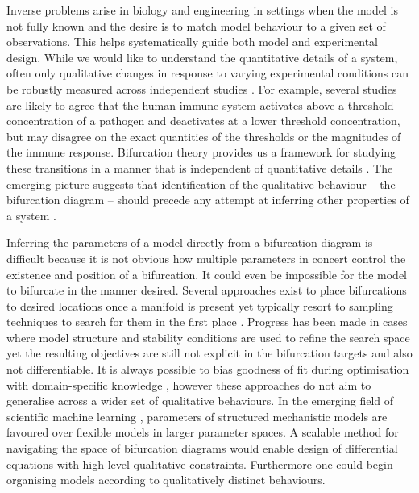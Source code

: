\documentclass{article}
\begin{document}
Inverse problems \cite{Abdulla2009InverseBiology} arise in biology and engineering in settings when the model is not fully known and the desire is to match model behaviour to a given set of observations. This helps systematically guide both model and experimental design. While we would like to understand the quantitative details of a system, often only qualitative changes in response to varying experimental conditions can be robustly measured across independent studies \cite{Tyson2001NetworkPhysiology,Grant2020InterpretationCircuit}. For example, several studies are likely to agree that the human immune system activates above a threshold concentration of a pathogen and deactivates at a lower threshold concentration, but may disagree on the exact quantities of the thresholds or the magnitudes of the immune response. Bifurcation theory provides us a framework for studying these transitions in a manner that is independent of quantitative details \cite{Kuznetsov2004TopologicalSystems}. The emerging picture suggests that identification of the qualitative behaviour -- the bifurcation diagram -- should precede any attempt at inferring other properties of a system \cite{Stumpf2019ParameterBifurcations}.

Inferring the parameters of a model directly from a bifurcation diagram is difficult because it is not obvious how multiple  parameters in concert control the existence and position of a bifurcation. It could even be impossible for the model to bifurcate in the manner desired. Several approaches exist to place bifurcations to desired locations once a manifold is present \cite{Iwasaki1997AnType,Lu2006InverseSystems,Dobson2004DistanceBifurcations} yet typically resort to sampling techniques to search for them in the first place \cite{Chickarmane2005BifurcationTool,Conrad2006BifurcationClock}. Progress has been made in cases where model structure and stability conditions are used to refine the search space \cite{Otero-Muras2018Optimization-basedModels,Otero-Muras2014ACurves} yet the resulting objectives are still not explicit in the bifurcation targets and also not differentiable. It is always possible to bias goodness of fit during optimisation with domain-specific knowledge \cite{}, however these approaches do not aim to generalise across a wider set of qualitative behaviours. In the emerging field of scientific machine learning \cite{Rackauckas2017Differentialequations.jlJulia,Rackauckas2018ASolutions,Rackauckas2020UniversalLearning}, parameters of structured mechanistic models are favoured over flexible models in larger parameter spaces. A scalable method for navigating the space of bifurcation diagrams would enable design of differential equations with high-level qualitative constraints. Furthermore one could begin organising models according to qualitatively distinct behaviours. 
\end{document}
